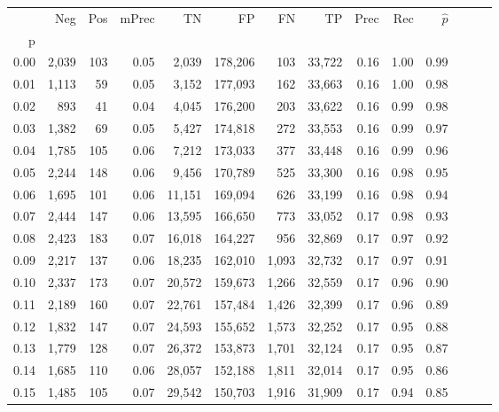 \begin{tabular}{rrrrrrrrrrrrrr}
\toprule
{} &    Neg &  Pos & mPrec &       TN &       FP &      FN &      TP &  Prec &   Rec & $\hat{p}$ \\
p    &        &      &       &          &          &         &         &       &       &           \\
\midrule
0.00 &  2,039 &  103 &  0.05 &    2,039 &  178,206 &     103 &  33,722 &  0.16 &  1.00 &      0.99 \\
0.01 &  1,113 &   59 &  0.05 &    3,152 &  177,093 &     162 &  33,663 &  0.16 &  1.00 &      0.98 \\
0.02 &    893 &   41 &  0.04 &    4,045 &  176,200 &     203 &  33,622 &  0.16 &  0.99 &      0.98 \\
0.03 &  1,382 &   69 &  0.05 &    5,427 &  174,818 &     272 &  33,553 &  0.16 &  0.99 &      0.97 \\
0.04 &  1,785 &  105 &  0.06 &    7,212 &  173,033 &     377 &  33,448 &  0.16 &  0.99 &      0.96 \\
0.05 &  2,244 &  148 &  0.06 &    9,456 &  170,789 &     525 &  33,300 &  0.16 &  0.98 &      0.95 \\
0.06 &  1,695 &  101 &  0.06 &   11,151 &  169,094 &     626 &  33,199 &  0.16 &  0.98 &      0.94 \\
0.07 &  2,444 &  147 &  0.06 &   13,595 &  166,650 &     773 &  33,052 &  0.17 &  0.98 &      0.93 \\
0.08 &  2,423 &  183 &  0.07 &   16,018 &  164,227 &     956 &  32,869 &  0.17 &  0.97 &      0.92 \\
0.09 &  2,217 &  137 &  0.06 &   18,235 &  162,010 &   1,093 &  32,732 &  0.17 &  0.97 &      0.91 \\
0.10 &  2,337 &  173 &  0.07 &   20,572 &  159,673 &   1,266 &  32,559 &  0.17 &  0.96 &      0.90 \\
0.11 &  2,189 &  160 &  0.07 &   22,761 &  157,484 &   1,426 &  32,399 &  0.17 &  0.96 &      0.89 \\
0.12 &  1,832 &  147 &  0.07 &   24,593 &  155,652 &   1,573 &  32,252 &  0.17 &  0.95 &      0.88 \\
0.13 &  1,779 &  128 &  0.07 &   26,372 &  153,873 &   1,701 &  32,124 &  0.17 &  0.95 &      0.87 \\
0.14 &  1,685 &  110 &  0.06 &   28,057 &  152,188 &   1,811 &  32,014 &  0.17 &  0.95 &      0.86 \\
0.15 &  1,485 &  105 &  0.07 &   29,542 &  150,703 &   1,916 &  31,909 &  0.17 &  0.94 &      0.85 \\

\end{tabular}
